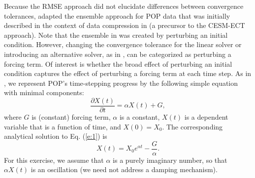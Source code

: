 \documentclass[gmd, manuscript]{copernicus}
\begin{document}
Because the RMSE approach did not elucidate differences between convergence tolerances, \cite{yong2015} adapted the ensemble approach for POP data that was initially described in the context of data compression in \cite{baker2014} (a precursor to the CESM-ECT approach).  Note that the ensemble in \cite{baker2014} was created by perturbing an initial condition.  However, changing the convergence tolerance for the linear solver or introducing an alternative solver, as in \cite{yong2015}, can be categorized as perturbing a forcing term. Of interest is whether the broad effect of perturbing an initial condition  captures the effect of perturbing a forcing term at each time step.
As in \cite{caya1998}, we represent POP's time-stepping progress by the following simple equation with minimal components: 
\begin{equation}
\frac{\partial X(t)}{\partial t} = \alpha X(t) +G,
\label{e:1}
\end{equation}
where $G$ is (constant) forcing term, $\alpha$ is a constant,  $X(t)$ is a dependent variable that is a function of time, and $X(0) = X_0$.
The corresponding analytical solution to Eq. (\ref{e:1}) is
\begin{equation}
X(t) = X_0e^{\alpha t } -\frac{G}{\alpha}. 
\label{e:2}
\end{equation}
For this exercise, we assume that $\alpha$ is a purely imaginary number, so that $\alpha X(t)$ is an oscillation 
(we need not address a damping mechanism).
\end{document}
